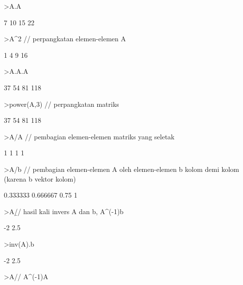 \documentclass[a4paper,11pt,oneside,enabledeprecatedfontcommands]{scrbook}
\newenvironment{eulernotebook}{}{}
\begin{document}
\begin{eulernotebook}
\begin{eulerprompt}
>A.A
\end{eulerprompt}
\begin{euleroutput}
            7            10 
           15            22 
\end{euleroutput}
\begin{eulerprompt}
>A^2 // perpangkatan elemen-elemen A
\end{eulerprompt}
\begin{euleroutput}
            1             4 
            9            16 
\end{euleroutput}
\begin{eulerprompt}
>A.A.A
\end{eulerprompt}
\begin{euleroutput}
           37            54 
           81           118 
\end{euleroutput}
\begin{eulerprompt}
>power(A,3) // perpangkatan matriks
\end{eulerprompt}
\begin{euleroutput}
           37            54 
           81           118 
\end{euleroutput}
\begin{eulerprompt}
>A/A // pembagian elemen-elemen matriks yang seletak
\end{eulerprompt}
\begin{euleroutput}
            1             1 
            1             1 
\end{euleroutput}
\begin{eulerprompt}
>A/b // pembagian elemen-elemen A oleh elemen-elemen b kolom demi kolom (karena b vektor kolom)
\end{eulerprompt}
\begin{euleroutput}
     0.333333      0.666667 
         0.75             1 
\end{euleroutput}
\begin{eulerprompt}
>A\b // hasil kali invers A dan b, A^(-1)b 
\end{eulerprompt}
\begin{euleroutput}
           -2 
          2.5 
\end{euleroutput}
\begin{eulerprompt}
>inv(A).b
\end{eulerprompt}
\begin{euleroutput}
           -2 
          2.5 
\end{euleroutput}
\begin{eulerprompt}
>A\A // A^(-1)A

\end{eulerprompt}
\end{eulernotebook}
\end{document}
